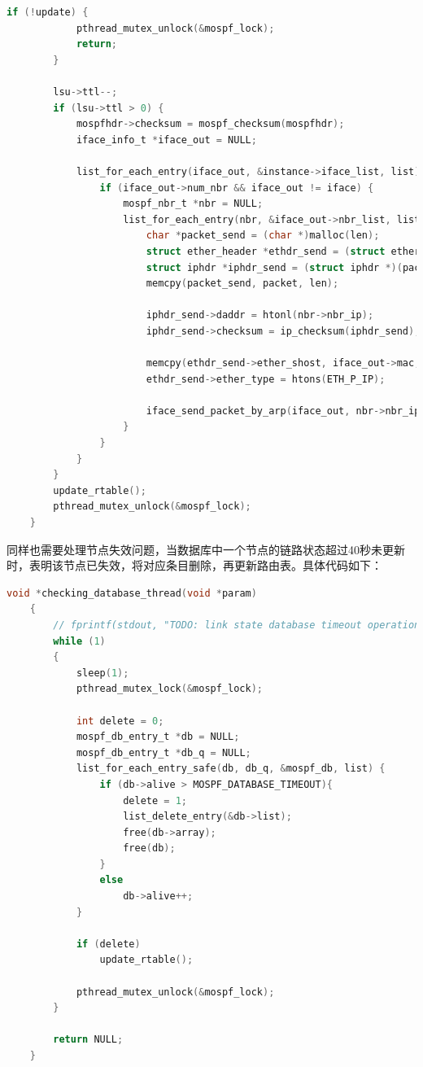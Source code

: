 \documentclass[UTF8]{report}
\begin{document}
\begin{lstlisting}[language=C]
        if (!update) {
            pthread_mutex_unlock(&mospf_lock);
            return;
        }
    
        lsu->ttl--;
        if (lsu->ttl > 0) {
            mospfhdr->checksum = mospf_checksum(mospfhdr);
            iface_info_t *iface_out = NULL;
    
            list_for_each_entry(iface_out, &instance->iface_list, list) {
                if (iface_out->num_nbr && iface_out != iface) {
                    mospf_nbr_t *nbr = NULL;
                    list_for_each_entry(nbr, &iface_out->nbr_list, list) {
                        char *packet_send = (char *)malloc(len);
                        struct ether_header *ethdr_send = (struct ether_header *)packet_send;
                        struct iphdr *iphdr_send = (struct iphdr *)(packet_send + ETHER_HDR_SIZE);
                        memcpy(packet_send, packet, len);
    
                        iphdr_send->daddr = htonl(nbr->nbr_ip);
                        iphdr_send->checksum = ip_checksum(iphdr_send);
    
                        memcpy(ethdr_send->ether_shost, iface_out->mac, ETH_ALEN);
                        ethdr_send->ether_type = htons(ETH_P_IP);
    
                        iface_send_packet_by_arp(iface_out, nbr->nbr_ip, packet_send, len);
                    }
                }
            }
        }
        update_rtable();
        pthread_mutex_unlock(&mospf_lock);
    }
\end{lstlisting}

同样也需要处理节点失效问题，当数据库中一个节点的链路状态超过40秒未更新时，表明该节点已失效，将对应条目删除，再更新路由表。具体代码如下：

\begin{lstlisting}[language=C]
    void *checking_database_thread(void *param)
    {
        // fprintf(stdout, "TODO: link state database timeout operation.\n");
        while (1)
        {
            sleep(1);
            pthread_mutex_lock(&mospf_lock);
    
            int delete = 0;
            mospf_db_entry_t *db = NULL;
            mospf_db_entry_t *db_q = NULL;
            list_for_each_entry_safe(db, db_q, &mospf_db, list) {
                if (db->alive > MOSPF_DATABASE_TIMEOUT){
                    delete = 1;
                    list_delete_entry(&db->list);
                    free(db->array);
                    free(db);
                }
                else
                    db->alive++;
            }
    
            if (delete)
                update_rtable();
    
            pthread_mutex_unlock(&mospf_lock);
        }
        
        return NULL;
    }
\end{lstlisting}
\end{document}
